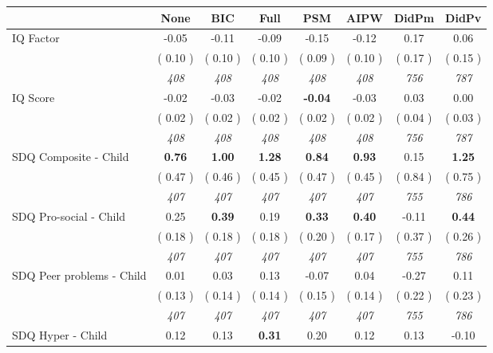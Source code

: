 \begin{tabular}{l c c c c c c c}
\toprule
 & None & BIC & Full & PSM & AIPW & DidPm & DidPv \\
\midrule
IQ Factor &     -0.05 &     -0.11 &     -0.09 &     -0.15 &     -0.12 &      0.17 &      0.06 \\
& (     0.10 ) & (     0.10 ) & (     0.10 ) & (     0.09 ) & (     0.10 ) & (     0.17 ) & (     0.15 ) \\
& \textit{ 408 } & \textit{ 408 } & \textit{ 408 } & \textit{ 408 } & \textit{ 408 } & \textit{ 756 } & \textit{ 787 } \\
IQ Score &     -0.02 &     -0.03 &     -0.02 & \textbf{    -0.04} &     -0.03 &      0.03 &      0.00 \\
& (     0.02 ) & (     0.02 ) & (     0.02 ) & (     0.02 ) & (     0.02 ) & (     0.04 ) & (     0.03 ) \\
& \textit{ 408 } & \textit{ 408 } & \textit{ 408 } & \textit{ 408 } & \textit{ 408 } & \textit{ 756 } & \textit{ 787 } \\
SDQ Composite - Child & \textbf{      0.76 } & \textbf{      1.00 } & \textbf{      1.28 } & \textbf{     0.84} & \textbf{     0.93} &      0.15 & \textbf{      1.25 } \\
& (     0.47 ) & (     0.46 ) & (     0.45 ) & (     0.47 ) & (     0.45 ) & (     0.84 ) & (     0.75 ) \\
& \textit{ 407 } & \textit{ 407 } & \textit{ 407 } & \textit{ 407 } & \textit{ 407 } & \textit{ 755 } & \textit{ 786 } \\
SDQ Pro-social - Child &      0.25 & \textbf{      0.39 } &      0.19 & \textbf{     0.33} & \textbf{     0.40} &     -0.11 & \textbf{      0.44 } \\
& (     0.18 ) & (     0.18 ) & (     0.18 ) & (     0.20 ) & (     0.17 ) & (     0.37 ) & (     0.26 ) \\
& \textit{ 407 } & \textit{ 407 } & \textit{ 407 } & \textit{ 407 } & \textit{ 407 } & \textit{ 755 } & \textit{ 786 } \\
SDQ Peer problems - Child &      0.01 &      0.03 &      0.13 &     -0.07 &      0.04 &     -0.27 &      0.11 \\
& (     0.13 ) & (     0.14 ) & (     0.14 ) & (     0.15 ) & (     0.14 ) & (     0.22 ) & (     0.23 ) \\
& \textit{ 407 } & \textit{ 407 } & \textit{ 407 } & \textit{ 407 } & \textit{ 407 } & \textit{ 755 } & \textit{ 786 } \\
SDQ Hyper - Child &      0.12 &      0.13 & \textbf{      0.31 } &      0.20 &      0.12 &      0.13 &     -0.10 \\

\end{tabular}
